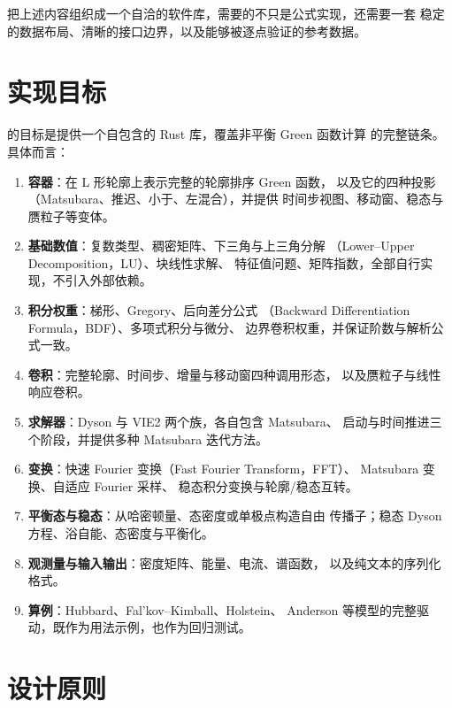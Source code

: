 把上述内容组织成一个自洽的软件库，需要的不只是公式实现，还需要一套
稳定的数据布局、清晰的接口边界，以及能够被逐点验证的参考数据。

\section{实现目标}
\label{sec:goals}

\kbpkg{} 的目标是提供一个自包含的 Rust 库，覆盖非平衡 Green 函数计算
的完整链条。具体而言：
\begin{enumerate}[label=(\arabic*)]
    \item \textbf{容器}：在 L 形轮廓上表示完整的轮廓排序 Green 函数，
          以及它的四种投影（Matsubara、推迟、小于、左混合），并提供
          时间步视图、移动窗、稳态与赝粒子等变体。
    \item \textbf{基础数值}：复数类型、稠密矩阵、下三角与上三角分解
          （Lower--Upper Decomposition，LU）、块线性求解、
          特征值问题、矩阵指数，全部自行实现，不引入外部依赖。
    \item \textbf{积分权重}：梯形、Gregory、后向差分公式
          （Backward Differentiation Formula，BDF）、多项式积分与微分、
          边界卷积权重，并保证阶数与解析公式一致。
    \item \textbf{卷积}：完整轮廓、时间步、增量与移动窗四种调用形态，
          以及赝粒子与线性响应卷积。
    \item \textbf{求解器}：Dyson 与 VIE2 两个族，各自包含 Matsubara、
          启动与时间推进三个阶段，并提供多种 Matsubara 迭代方法。
    \item \textbf{变换}：快速 Fourier 变换（Fast Fourier Transform，FFT）、
          Matsubara 变换、自适应 Fourier 采样、
          稳态积分变换与轮廓/稳态互转。
    \item \textbf{平衡态与稳态}：从哈密顿量、态密度或单极点构造自由
          传播子；稳态 Dyson 方程、浴自能、态密度与平衡化。
    \item \textbf{观测量与输入输出}：密度矩阵、能量、电流、谱函数，
          以及纯文本的序列化格式。
    \item \textbf{算例}：Hubbard、Fal'kov--Kimball、Holstein、
          Anderson 等模型的完整驱动，既作为用法示例，也作为回归测试。
\end{enumerate}

\section{设计原则}
\label{sec:principles}

